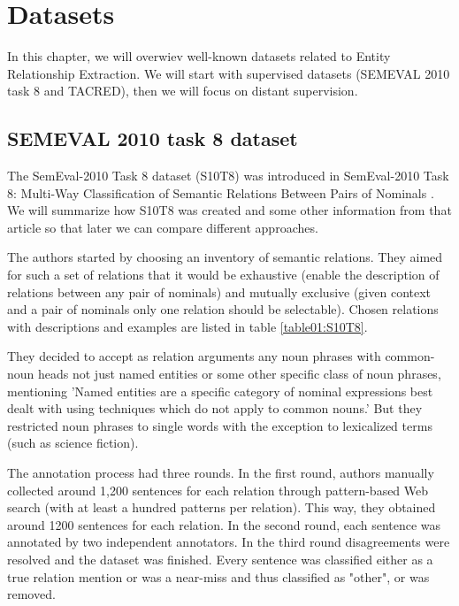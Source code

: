 \chapter{Datasets}

In this chapter, we will overwiev well-known datasets related to Entity Relationship Extraction. We will start with supervised datasets (SEMEVAL 2010 task 8 and TACRED), then we will focus on distant supervision.



\section{SEMEVAL 2010 task 8 dataset}
The SemEval-2010 Task 8 dataset (S10T8) was introduced in SemEval-2010 Task 8: Multi-Way Classification of Semantic Relations Between Pairs of Nominals \cite{semeval}. We will summarize how S10T8 was created and some other information from that article so that later we can compare different approaches.


The authors started by choosing an inventory of semantic relations. They aimed for such a set of relations that it would be exhaustive (enable the description of relations between any pair of nominals) and mutually exclusive (given context and a pair of nominals only one relation should be selectable).  Chosen relations with descriptions and examples are listed in table \ref{table01:S10T8}. 

They decided to accept as relation arguments any noun phrases with common-noun heads not just named entities or some other specific class of noun phrases, mentioning  'Named entities are a specific category of nominal expressions best dealt with using techniques which do not apply to common nouns.'  But they restricted noun phrases to single words with the exception to lexicalized terms (such as  science fiction).

The annotation process had three rounds. In the first round, authors manually collected around 1,200 sentences for each relation through pattern-based Web search (with at least a hundred patterns per relation). This way, they obtained around 1200 sentences for each relation. In the second round, each sentence was annotated by two independent annotators. In the third round disagreements were resolved and the dataset was finished. Every sentence was classified either as a true relation mention or was a  near-miss and thus classified as "other", or was removed.

